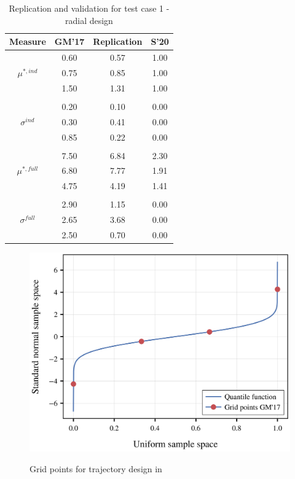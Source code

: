 \documentclass[a4paper,12pt]{article}
\begin{document}
\setlength{\tabcolsep}{12pt} %
\begin{table}[H]
	\centering
	\caption{Replication and validation for test case 1 - radial design}
	\label{tab:my-table}
	\renewcommand{\arraystretch}{1.2}%
	\begin{tabular}{cS[table-format=3.2]S[table-format=3.2]S[table-format=3.2]}
		\toprule
		{Measure}     & {GM'17}   & {Replication}  & {S'20} \\ 
		\midrule
		
		& 0.60  & 0.57         &  1.00 \\
		\qquad $\mu^{*,ind}$                               & 0.75  & 0.85         &  1.00 \\
		& 1.50  & 1.31         &  1.00 \\
		&&& \\
		& 0.20   & 0.10         &  0.00 \\
		\qquad $\sigma^{ind}$                            & 0.30   & 0.41         &  0.00 \\
		& 0.85  & 0.22         & 0.00 \\
		&&& \\
		& 7.50  & 6.84         &  2.30 \\
		\qquad $\mu^{*,full}$                              & 6.80   & 7.77         &  1.91 \\
		& 4.75  & 4.19         &  1.41 \\
		&&& \\
		& 2.90  & 1.15         &  0.00 \\
		\qquad $\sigma^{full}$                           & 2.65  & 3.68         &  0.00 \\
		& 2.50   & 0.70         &  0.00 \\ \bottomrule
	\end{tabular}
\end{table}

\begin{figure}[H]
	\caption{Grid points for trajectory design in \cite{ge2017extending}}
	\centering
	\includegraphics[scale=0.40]{../../../scrypy/figures/quantile_fct}
	\label{fig:rad}
\end{figure}
\end{document}
